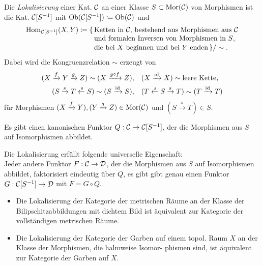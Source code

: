 \documentclass{cheat-sheet}
\begin{document}


\begin{defn}
  Die \emph{Lokalisierung} einer Kat. $\mathcal{C}$ an einer Klasse $S \subset \operatorname{Mor}(\mathcal{C})$ von Morphismen ist die Kat. $\mathcal{C}[S^{-1}]$ mit $\operatorname{Ob}(\mathcal{C}[S^{-1}]) \coloneqq \operatorname{Ob}(\mathcal{C})$ und
  \begin{align*}
    \operatorname{Hom}_{\mathcal{C}[S^{-1}]}(X, Y) \coloneqq \{ \, & \text{Ketten in $\mathcal{C}$, bestehend aus Morphismen aus $\mathcal{C}$} \\[-4pt]
    & \text{und formalen Inversen von Morphismen in $S$,} \\[-2pt]
    & \text{die bei $X$ beginnen und bei $Y$ enden} \, \} / \sim.
  \end{align*}
  Dabei wird die Kongruenzrelation ${\sim}$ erzeugt von
  \begin{align*}
    (X \xrightarrow{f} Y \xrightarrow{g} Z) \sim (X \xrightarrow{g \circ f} Z), \quad
    & (X \xrightarrow{\operatorname{id}} X) \sim \text{leere Kette}, \\
    (S \xrightarrow{s} T \xleftarrow{s} S) \sim (S \xrightarrow{\operatorname{id}} S), \quad
    & (T \xleftarrow{s} S \xrightarrow{s} T) \sim (T \xrightarrow{\operatorname{id}} T)
  \end{align*}
  für Morphismen $(X \xrightarrow{f} Y), (Y \xrightarrow{g} Z) \in \operatorname{Mor}(\mathcal{C})$ und $(S \xrightarrow{s} T) \in S$.
\end{defn}

\begin{bem}
  Es gibt einen kanonischen Funktor $Q : \mathcal{C} \to \mathcal{C}[S^{-1}]$, der die Morphismen aus $S$ auf Isomorphismen abbildet.
\end{bem}

\begin{lem}
  Die Lokalisierung erfüllt folgende universelle Eigenschaft: \\
  Jeder andere Funktor $F : \mathcal{C} \to \mathcal{D}$, der die Morphismen aus $S$ auf Isomorphismen abbildet, faktorisiert eindeutig über $Q$, \dh{} es gibt gibt genau einen Funktor $G : \mathcal{C}[S^{-1}] \to \mathcal{D}$ mit $F = G \circ Q$.
\end{lem}

\begin{bspe}
  \begin{itemize}
    \item Die Lokalisierung der Kategorie der metrischen Räume an der Klasse der Bilipschitzabbildungen mit dichtem Bild ist äquivalent zur Kategorie der vollständigen metrischen Räume.
    \item Die Lokalisierung der Kategorie der Garben auf einem topol. Raum $X$ an der Klasse der Morphismen, die halmweise Isomor- phismen sind, ist äquivalent zur Kategorie der Garben auf $X$.
  \end{itemize}
\end{bspe}
\end{document}

